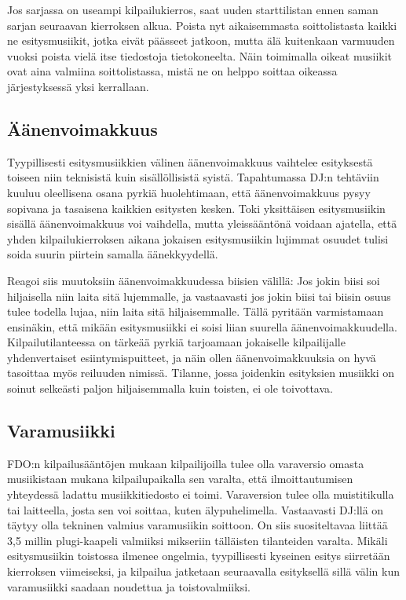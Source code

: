 \documentclass[12pt, a4paper, oneside]{article}
\begin{document}
Jos sarjassa on useampi kilpailukierros,
saat uuden starttilistan ennen saman sarjan seuraavan kierroksen alkua.
Poista nyt aikaisemmasta soittolistasta kaikki ne esitysmusiikit,
jotka eivät päässeet jatkoon,
mutta älä kuitenkaan varmuuden vuoksi poista vielä itse tiedostoja tietokoneelta.
Näin toimimalla oikeat musiikit ovat aina valmiina soittolistassa,
mistä ne on helppo soittaa oikeassa järjestyksessä yksi kerrallaan.

\subsection{Äänenvoimakkuus} \label{subsec:aanenvoimakkuus}

Tyypillisesti esitysmusiikkien välinen äänenvoimakkuus vaihtelee esityksestä toiseen niin teknisistä kuin sisällöllisistä syistä.
Tapahtumassa DJ:n tehtäviin kuuluu oleellisena osana pyrkiä huolehtimaan,
että äänenvoimakkuus pysyy sopivana ja tasaisena kaikkien esitysten kesken.
Toki yksittäisen esitysmusiikin sisällä äänenvoimakkuus voi vaihdella,
mutta yleissääntönä voidaan ajatella,
että yhden kilpailukierroksen aikana jokaisen esitysmusiikin lujimmat osuudet tulisi soida suurin piirtein samalla äänekkyydellä.

Reagoi siis muutoksiin äänenvoimakkuudessa biisien välillä:
Jos jokin biisi soi hiljaisella niin laita sitä lujemmalle,
ja vastaavasti jos jokin biisi tai biisin osuus tulee todella lujaa,
niin laita sitä hiljaisemmalle.
Tällä pyritään varmistamaan ensinäkin,
että mikään esitysmusiikki ei soisi liian suurella äänenvoimakkuudella.
Kilpailutilanteessa on tärkeää pyrkiä tarjoamaan jokaiselle kilpailijalle yhdenvertaiset esiintymispuitteet,
ja näin ollen äänenvoimakkuuksia on hyvä tasoittaa myös reiluuden nimissä.
Tilanne,
jossa joidenkin esityksien musiikki on soinut selkeästi paljon hiljaisemmalla kuin toisten,
ei ole toivottava.

\subsection{Varamusiikki} \label{subsec:varamusiikki}

FDO:n kilpailusääntöjen mukaan kilpailijoilla tulee olla varaversio omasta musiikistaan mukana kilpailupaikalla sen varalta,
että ilmoittautumisen yhteydessä ladattu musiikkitiedosto ei toimi.
Varaversion tulee olla muistitikulla tai laitteella,
josta sen voi soittaa,
kuten älypuhelimella.
Vastaavasti DJ:llä on täytyy olla tekninen valmius varamusiikin soittoon.
On siis suositeltavaa liittää 3,5 millin plugi-kaapeli valmiiksi mikseriin tälläisten tilanteiden varalta.
Mikäli esitysmusiikin toistossa ilmenee ongelmia,
tyypillisesti kyseinen esitys siirretään kierroksen viimeiseksi,
ja kilpailua jatketaan seuraavalla esityksellä sillä välin kun varamusiikki saadaan noudettua ja toistovalmiiksi.
\end{document}
